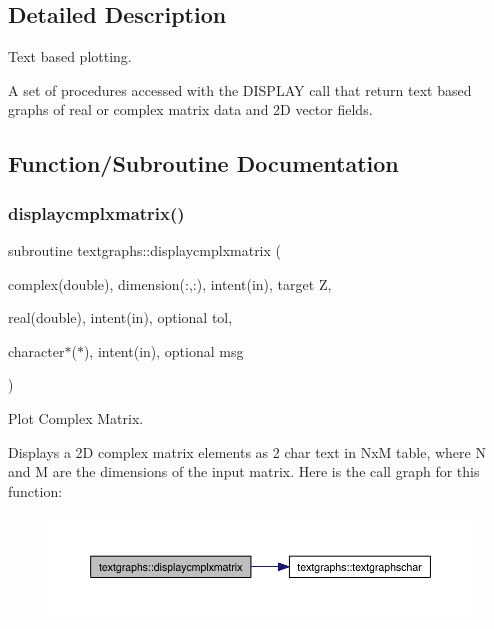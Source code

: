 \subsection{Detailed Description}
Text based plotting. 

A set of procedures accessed with the D\+I\+S\+P\+L\+AY call that return text based graphs of real or complex matrix data and 2D vector fields. 

\subsection{Function/\+Subroutine Documentation}
\mbox{\label{namespacetextgraphs_a34e0dbcefa5d7f20393912bea281116e}} 
\subsubsection{\texorpdfstring{displaycmplxmatrix()}{displaycmplxmatrix()}}
{\footnotesize\ttfamily subroutine textgraphs\+::displaycmplxmatrix (\begin{DoxyParamCaption}\item[{complex(double), dimension(\+:,\+:), intent(in), target}]{Z,  }\item[{real(double), intent(in), optional}]{tol,  }\item[{character$\ast$($\ast$), intent(in), optional}]{msg }\end{DoxyParamCaption})\hspace{0.3cm}{\ttfamily [private]}}



Plot Complex Matrix. 

Displays a 2D complex matrix elements as 2 char text in NxM table, where N and M are the dimensions of the input matrix. Here is the call graph for this function\+:\nopagebreak
\begin{figure}[H]
\begin{center}
\leavevmode
\includegraphics[width=350pt]{namespacetextgraphs_a34e0dbcefa5d7f20393912bea281116e_cgraph}
\end{center}
\end{figure}
\mbox{\label{namespacetextgraphs_aec95adcc32b77f95f0a3625ca97cc374}} 
